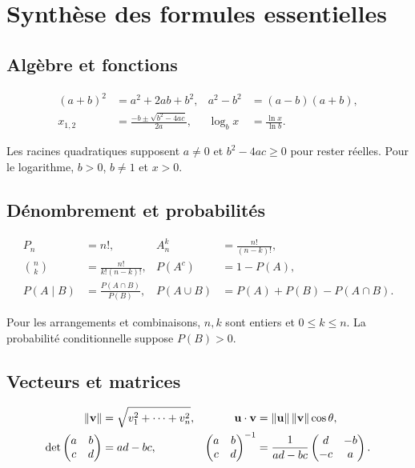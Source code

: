 \chapter*{Synthèse des formules essentielles}

\section*{Algèbre et fonctions}
\begin{align*}
(a+b)^2&=a^2+2ab+b^2,
&a^2-b^2&=(a-b)(a+b),\\
x_{1,2}&=\frac{-b\pm\sqrt{b^2-4ac}}{2a},
&\log_bx&=\frac{\ln x}{\ln b}.
\end{align*}

Les racines quadratiques supposent \(a\ne0\) et \(b^2-4ac\ge0\) pour rester réelles. Pour le logarithme, \(b>0\), \(b\ne1\) et \(x>0\).

\section*{Dénombrement et probabilités}
\begin{align*}
P_n&=n!,&
A_n^k&=\frac{n!}{(n-k)!},\\
\binom nk&=\frac{n!}{k!(n-k)!},&
P(A^c)&=1-P(A),\\
P(A\mid B)&=\frac{P(A\cap B)}{P(B)},&
P(A\cup B)&=P(A)+P(B)-P(A\cap B).
\end{align*}

Pour les arrangements et combinaisons, \(n,k\) sont entiers et \(0\le k\le n\). La probabilité conditionnelle suppose \(P(B)>0\).

\section*{Vecteurs et matrices}
\begin{align*}
\left\lVert \mathbf v\right\rVert&=\sqrt{v_1^2+\cdots+v_n^2},
&\mathbf u\cdot\mathbf v&=\left\lVert \mathbf u\right\rVert\left\lVert \mathbf v\right\rVert\cos\theta,\\
\det\begin{pmatrix}a&b\\c&d\end{pmatrix}&=ad-bc,
&\begin{pmatrix}a&b\\c&d\end{pmatrix}^{-1}
&=\frac1{ad-bc}\begin{pmatrix}d&-b\\-c&a\end{pmatrix}.
\end{align*}

